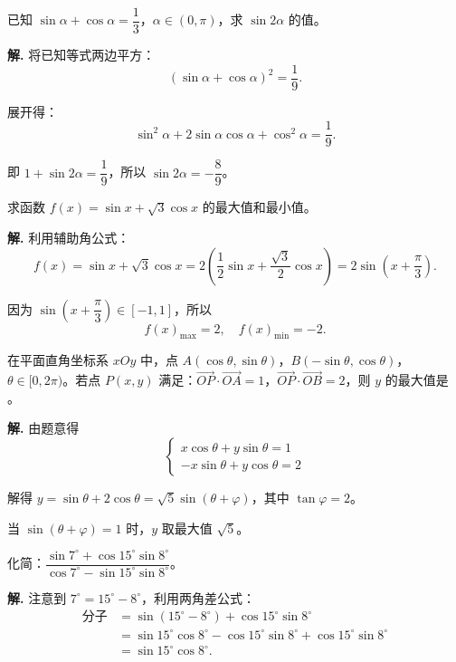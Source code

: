 \documentclass[11pt]{ctexrep}
\begin{document}
\begin{example}[二倍角公式的应用]
    已知 $\sin\alpha + \cos\alpha = \dfrac{1}{3}$，$\alpha \in (0, \pi)$，求 $\sin 2\alpha$ 的值。
\end{example}

\textbf{解.} 将已知等式两边平方：
\[
    (\sin\alpha + \cos\alpha)^2 = \frac{1}{9}.
\]

展开得：
\[
    \sin^2\alpha + 2\sin\alpha\cos\alpha + \cos^2\alpha = \frac{1}{9}.
\]

即 $1 + \sin 2\alpha = \dfrac{1}{9}$，所以 $\sin 2\alpha = -\dfrac{8}{9}$。

\begin{example}[辅助角公式的应用]
    求函数 $f(x) = \sin x + \sqrt{3}\cos x$ 的最大值和最小值。
\end{example}

\textbf{解.} 利用辅助角公式：
\[
    f(x) = \sin x + \sqrt{3}\cos x = 2\left(\frac{1}{2}\sin x + \frac{\sqrt{3}}{2}\cos x\right) = 2\sin\left(x + \frac{\pi}{3}\right).
\]

因为 $\sin\left(x + \dfrac{\pi}{3}\right) \in [-1, 1]$，所以
\[
    f(x)_{\max} = 2, \quad f(x)_{\min} = -2.
\]

\begin{realexam}[2026 奉贤高三二模]
    在平面直角坐标系 $xOy$ 中，点 $A(\cos\theta, \sin\theta)$，$B(-\sin\theta, \cos\theta)$，$\theta \in [0, 2\pi)$。若点 $P(x, y)$ 满足：$\overrightarrow{OP} \cdot \overrightarrow{OA} = 1$，$\overrightarrow{OP} \cdot \overrightarrow{OB} = 2$，则 $y$ 的最大值是 \underline{\hspace{2cm}}。
\end{realexam}

\textbf{解.} 由题意得
\[
    \begin{cases}
        x\cos\theta + y\sin\theta = 1 \\
        -x\sin\theta + y\cos\theta = 2
    \end{cases}
\]

解得 $y = \sin\theta + 2\cos\theta = \sqrt{5}\sin(\theta + \varphi)$，其中 $\tan\varphi = 2$。

当 $\sin(\theta + \varphi) = 1$ 时，$y$ 取最大值 $\sqrt{5}$。

\begin{realexam}[练习]
    化简：$\dfrac{\sin 7^{\circ} + \cos 15^{\circ}\sin 8^{\circ}}{\cos 7^{\circ} - \sin 15^{\circ}\sin 8^{\circ}}$。
\end{realexam}

\textbf{解.} 注意到 $7^{\circ} = 15^{\circ} - 8^{\circ}$，利用两角差公式：
\begin{align*}
    \text{分子} &= \sin(15^{\circ} - 8^{\circ}) + \cos 15^{\circ}\sin 8^{\circ} \\
    &= \sin 15^{\circ}\cos 8^{\circ} - \cos 15^{\circ}\sin 8^{\circ} + \cos 15^{\circ}\sin 8^{\circ} \\
    &= \sin 15^{\circ}\cos 8^{\circ}.
\end{align*}
\end{document}
